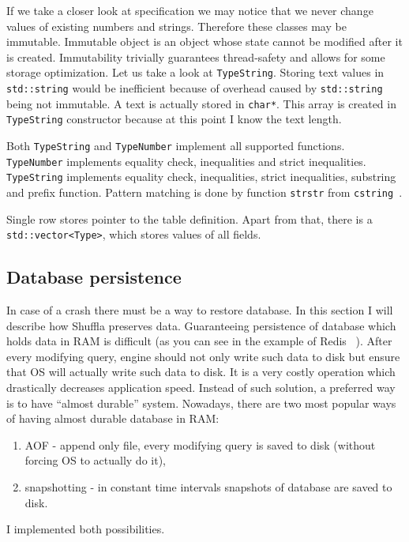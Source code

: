 \documentclass[10pt,a4paper]{article}
\begin{document}
If we take a closer look at specification we may notice that we never change values of existing numbers and strings. Therefore these classes may be immutable. Immutable object is an object whose state cannot be modified after it is created. Immutability trivially guarantees thread-safety and allows for some storage optimization. Let us take a look at \verb|TypeString|. Storing text values in \verb|std::string| would be inefficient because of overhead caused by \verb|std::string| being not immutable. A text is actually stored in \verb|char*|. This array is created in \verb|TypeString| constructor because at this point I know the text length.   

Both \verb|TypeString| and \verb|TypeNumber| implement all supported functions. \verb|TypeNumber| implements equality check, inequalities and strict inequalities. \verb|TypeString| implements equality check, inequalities, strict inequalities, substring and prefix function. Pattern matching is done by function \verb|strstr| from \verb|cstring|~\cite{STRSTR}.

Single row stores pointer to the table definition. Apart from that, there is a \verb|std::vector<Type>|, which stores values of all fields.

\subsection{Database persistence}

In case of a crash there must be a way to restore database. In this section I will describe how Shuffla preserves data. Guaranteeing persistence of database which holds data in RAM is difficult (as you can see in the example of Redis ~\cite{REDPE}). After every modifying query, engine should not only write such data to disk but ensure that OS will actually write such data to disk. It is a very costly operation which drastically decreases application speed. Instead of such solution, a preferred way is to have “almost durable” system.
Nowadays, there are two most popular ways of having almost durable database in RAM:

\begin{enumerate}
\item AOF - append only file, every modifying query is saved to disk (without forcing OS to actually do it),
\item snapshotting - in constant time intervals snapshots of database are saved to disk.
\end{enumerate}
I implemented both possibilities. 
\end{document}
